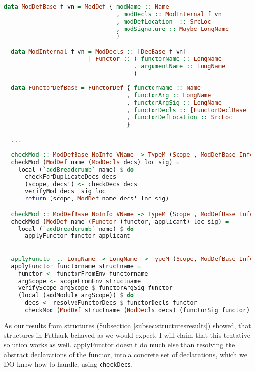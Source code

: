 \begin{lstlisting}[language=Haskell]
  data ModDefBase f vn = ModDef { modName :: Name
                                , modDecls :: ModInternal f vn
                                , modDefLocation  :: SrcLoc
                                , modSignature :: Maybe LongName
                                }

  data ModInternal f vn = ModDecls :: [DecBase f vn]
                        | Functor :: ( functorName :: LongName
                                     . argumentName :: LongName
                                     )
  
  data FunctorDefBase = FunctorDef { functorName :: Name
                                   , functorArg :: LongName
                                   , functorArgSig :: LongName
                                   , functorDecls :: [FunctorDeclBase f vn]
                                   , functorDefLocation :: SrcLoc
                                   }

  ...
                                     
  checkMod :: ModDefBase NoInfo VName -> TypeM (Scope , ModDefBase Info VName)
  checkMod (ModDef name (ModDecls decs) loc sig) =
    local (`addBreadcrumb` name) $ do
      checkForDuplicateDecs decs
      (scope, decs') <- checkDecs decs
      verifyMod decs' sig loc
      return (scope, ModDef name decs' loc sig)

  checkMod :: ModDefBase NoInfo VName -> TypeM (Scope , ModDefBase Info VName)
  checkMod (ModDef name (Functor (functor, applicant) loc sig) =
    local (`addBreadcrumb` name) $ do
      applyFunctor functor applicant

  
  applyFunctor :: LongName -> LongName -> TypeM (Scope, ModDefBase Info VName)
  applyFunctor functorname structname =
    functor <- functorFromEnv functorname
    argScope <- scopeFromEnv structname    
    verifyScope argScope $ functorArgSig functor
    (local (addModule argScope)) $ do
      decs <- resolveFunctorDecs $ functorDecls functor
      checkMod (ModDef structname (ModDecls decs) (functorSig functor) (functorDefLocation functor))
\end{lstlisting}

As our results from structures (Subsection \ref{subsec:structuresresults}) showed, that structures in
Futhark behaved as we would expect, I will claim that this tentative solution
works as well.
applyFunctor doesn't do much else than resolving the abstract declarations of
the functor, into a concrete set of declarations, which we DO know how to
handle, using \texttt{checkDecs}.
